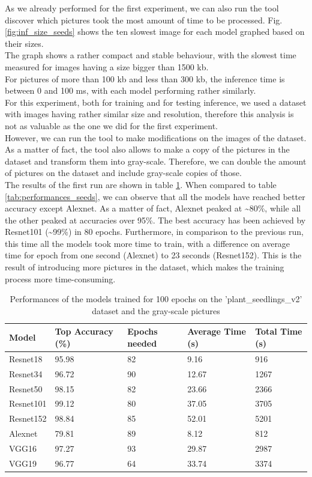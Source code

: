 As we already performed for the first experiment, we can also run the tool discover which pictures took the most amount of time to be processed. Fig. \ref{fig:inf_size_seeds} shows the ten slowest image for each model graphed based on their sizes. \\
The graph shows a rather compact and stable behaviour, with the slowest time measured for images having a size bigger than 1500 kb. \\
For pictures of more than 100 kb and less than 300 kb, the inference time is between 0 and 100 ms, with each model performing rather similarly. \\
For this experiment, both for training and for testing inference, we used a dataset with images having rather similar size and resolution, therefore this analysis is not as valuable as the one we did for the first experiment. \\
However, we can run the tool to make modifications on the images of the dataset. As a matter of fact, the tool also allows to make a copy of the pictures in the dataset and transform them into gray-scale. Therefore, we can double the amount of pictures on the dataset and include gray-scale copies of those. \\
The results of the first run are shown in table \ref{tab:performances_seeds_gray}. When compared to 
table \ref{tab:performances_seeds}, we can observe that all the models have reached better accuracy except Alexnet. As a matter of fact, Alexnet peaked at \textasciitilde80\%, while all the other peaked at accuracies over 95\%. The best accuracy has been achieved by Resnet101 (\textasciitilde99\%) in 80 epochs. Furthermore, in comparison to the previous run, this time all the models took more time to train, with a difference on average time for epoch from one second (Alexnet) to 23 seconds (Resnet152). This is the result of introducing more pictures in the dataset, which makes the training process more time-consuming. \\
\begin{table}[htbp]
\centering
\begin{tabular}{ p{2cm} p{4cm} p{3cm} p{3cm} p{2cm}  }
 Model& Top Accuracy (\%) & Epochs needed &Average Time (s)&Total Time (s)\\
 \hline
Resnet18&95.98&82&9.16&916\\
Resnet34&96.72&90&12.67&1267\\
Resnet50&98.15&82&23.66&2366\\
Resnet101&99.12&80&37.05&3705\\
Resnet152&98.84&85&52.01&5201\\
Alexnet&79.81&89&8.12&812\\
VGG16&97.27&93&29.87&2987\\
VGG19&96.77&64&33.74&3374\\
 \hline
\end{tabular}
\caption{Performances of the models trained for 100 epochs on the 'plant\_seedlings\_v2' dataset and the gray-scale pictures}
\label{tab:performances_seeds_gray}
\end{table}

